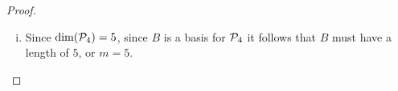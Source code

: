 \begin{proof}
\begin{enumerate}[(i)]
        Moreover, since $\dim(\P_4)=5$ and $B$ has a length of 5, from Theorem 2.39 Section 2C LADR it follows that $B$ is a basis for $\P_4$.
        Therefore, it is possible that no polynomial in $B$ has degree 2.\qed
        \item Since $\dim(\P_4)=5$, since $B$ is a basis for $\P_4$ it follows that $B$ must have a length of $5$, or $m=5$.
    \end{enumerate}
    \renewcommand{\qedsymbol}{}
\end{proof}